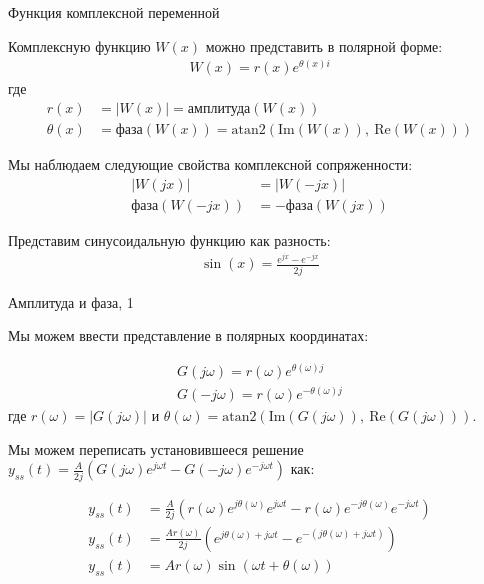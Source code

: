 \documentclass{beamer}
\begin{document}
\begin{frame}{Функция комплексной переменной}
	\begin{flushleft}
		
		Комплексную функцию $W(x)$ можно представить в полярной форме:
		\begin{align}
			W(x) = r(x) e^{\theta(x) i}
		\end{align}
		где 
		\begin{align}
			r(x) &= |W(x)| = \text{амплитуда}(W(x))
			\\
			\theta(x) &= \text{фаза}(W(x)) = \text{atan2}( \text{Im}(W(x)), \ \text{Re}(W(x))  )
		\end{align}
		
		Мы наблюдаем следующие свойства комплексной сопряженности:
		\begin{align}
			|W(jx)| &= |W(-jx)|
			\\
			\text{фаза}(W(-jx)) &= -\text{фаза}(W(jx))
		\end{align}
		
		\bigskip
		
		Представим синусоидальную функцию как разность:
		\begin{align}
			\sin(x) = \frac{e^{jx}-e^{-jx}}{2j}
		\end{align}
		
	\end{flushleft}
\end{frame}


\begin{frame}{Амплитуда и фаза, 1}
	\begin{flushleft}
		
		Мы можем ввести представление в полярных координатах:
		
		\begin{align}
			G(j\omega) = r(\omega) e^{\theta(\omega) j} 
			\\
			G(-j\omega) = r(\omega) e^{-\theta(\omega) j}
		\end{align}
		где $r(\omega) = |G(j\omega)|$ и 
		$\theta(\omega) = \text{atan2}( \text{Im}(G(j\omega)), \ \text{Re}(G(j\omega))  )$.
		
		\bigskip
		
		Мы можем переписать установившееся решение $y_{ss}(t) = 
		\frac{A}{2j}
		\left(
		G(j\omega)e^{ j\omega t} - G(-j\omega) e^{- j\omega t}
		\right)$ как:
		
		\begin{align}
			y_{ss}(t) &= 
			\frac{A}{2j}
			\left(
			r(\omega) e^{j \theta(\omega) }e^{ j\omega t} - r(\omega) e^{-j\theta(\omega) } e^{- j\omega t}
			\right)
			\\
			y_{ss}(t) &= 
			\frac{A r(\omega)}{2j}
			\left(
			e^{j \theta(\omega) + j\omega t} - e^{-(j \theta(\omega) + j\omega t)}
			\right)
			\\
			y_{ss}(t) &= 
			A r(\omega) \sin (\omega t + \theta(\omega))
		\end{align}
		
	\end{flushleft}
\end{frame}
\end{document}
